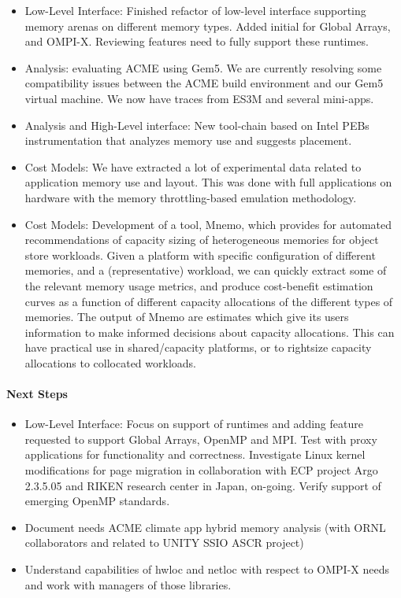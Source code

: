 \begin{itemize}
\item  Low-Level Interface: Finished refactor of low-level interface supporting memory arenas on different memory types. Added initial for Global Arrays, and OMPI-X. Reviewing features need to fully support these runtimes.

\item Analysis: evaluating ACME using Gem5. We are currently resolving some compatibility issues between the ACME build environment and our Gem5 virtual machine. We now have traces from ES3M and several mini-apps.
\item Analysis and High-Level interface: New tool-chain  based on Intel PEBs instrumentation that analyzes memory use and suggests placement.
\item Cost Models: We have extracted a lot of experimental data related to application memory use and layout. This was done with full applications on hardware with the memory throttling-based emulation methodology.

\item Cost Models: Development of a tool, Mnemo, which provides for automated recommendations of capacity sizing of heterogeneous memories for object store workloads. Given a platform with specific configuration of different memories, and a (representative) workload, we can quickly extract some of the relevant memory usage metrics, and produce cost-benefit estimation curves as a function of different capacity allocations of the different types of memories. The output of Mnemo are estimates which give its users information to make informed decisions about capacity allocations. This can have practical use in shared/capacity platforms, or to rightsize capacity allocations to collocated workloads. 
\end{itemize}
\paragraph{Next Steps}
\begin{itemize}
\item  Low-Level Interface: Focus on support of runtimes and adding feature requested to support Global Arrays, OpenMP and MPI. Test with proxy applications for functionality and correctness. Investigate Linux kernel modifications for page migration in collaboration with ECP project Argo 2.3.5.05 and RIKEN research center in Japan, on-going. Verify support of emerging OpenMP standards.
\item Document needs ACME climate app hybrid memory analysis (with ORNL collaborators and related to UNITY SSIO ASCR project)
\item Understand capabilities of hwloc and netloc with respect to OMPI-X needs and work with managers of those libraries.
\end{itemize}


